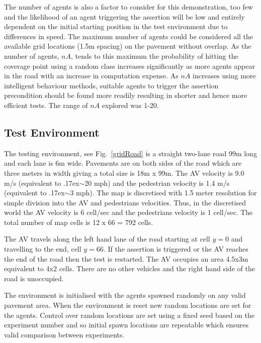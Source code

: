 \documentclass[letterpaper, 10 pt, journal, twoside]{IEEEtran}
\begin{document}
The number of agents is also a factor to consider for this demonstration, too few and the likelihood of an agent triggering the assertion will be low and entirely dependent on the initial starting position in the test environment due to differences in speed. The maximum number of agents could be considered all the available grid locations (1.5m spacing) on the pavement without overlap.
As the number of agents, $nA$, tends to this maximum the probability of hitting the coverage point using a random class increases significantly as more agents appear in the road with an increase in computation expense. As $nA$ increases using more intelligent behaviour methods, suitable agents to trigger the assertion precondition should be found more readily resulting in shorter and hence more efficient tests. The range of $nA$ explored was 1-20.


\subsection{Test Environment}
The testing environment, see Fig.~\ref{gridRoad} is a straight two-lane road 99m long and each lane is 6m wide. Pavements are on both sides of the road which are three meters in width giving a total size is 18m x 99m. 
%
The AV velocity is 9.0 m/s (equivalent to {\raise.17ex\hbox{$\scriptstyle\sim$}}20 mph) and the pedestrian velocity is 1.4 m/s (equivalent to {\raise.17ex\hbox{$\scriptstyle\sim$}}3 mph). The map is discretised with 1.5 meter resolution for simple division into the AV and pedestrians velocities. Thus, in the discretised world the AV velocity is 6 cell/sec and the pedestrians velocity is 1 cell/sec. The total number of map cells is 12 x 66 = 792 cells. 

The AV travels along the left hand lane of the road starting at cell $y=0$ and travelling to the end, cell $y=66$. If the assertion is triggered or the AV reaches the end of the road then the test is restarted. The AV occupies an area 4.5x3m equivalent to 4x2 cells. There are no other vehicles and the right hand side of the road is unoccupied.

The environment is initialised with the agents spawned randomly on any valid pavement area. When the environment is reset new random locations are set for the agents. Control over random locations are set using a fixed seed based on the experiment number and so initial spawn locations are repeatable %
which ensures valid comparison between experiments.
\end{document}
